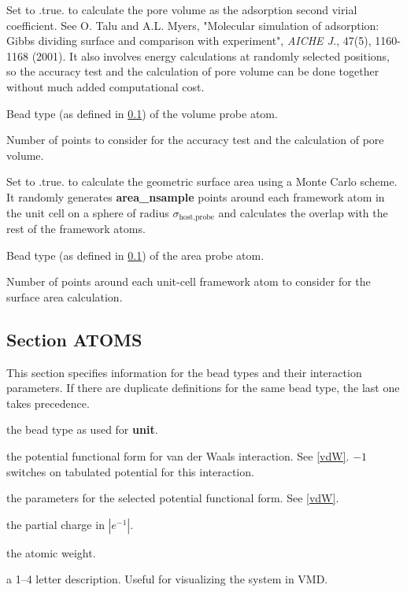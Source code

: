 \documentclass[12pt,letterpaper]{article}
\begin{document}
 Set to .true. to calculate the
pore volume as the adsorption second virial coefficient. See
O. Talu and A.L. Myers, "Molecular simulation of adsorption:
Gibbs dividing surface and comparison with experiment",
\textit{AICHE J.}, 47(5), 1160-1168 (2001). It also involves
energy calculations at randomly selected positions, so the
accuracy test and the calculation of pore volume can be done
together without much added computational cost.

 Bead type (as defined in
\ref{atoms}) of the volume probe atom.

 Number of points to consider
for the accuracy test and the calculation of pore volume.

 Set to .true. to calculate
the geometric surface area using a Monte Carlo scheme. It
randomly generates \textbf{area\_nsample} points around each
framework atom in the unit cell on a sphere of radius
$\sigma_{\textrm{host,probe}}$ and calculates the overlap
with the rest of the framework atoms.

 Bead type (as defined in
\ref{atoms}) of the area probe atom.

 Number of points around each
unit-cell framework atom to consider for the surface area
calculation.

\subsection{Section \textbf{ATOMS}}
\label{atoms}
This section specifies information for the bead types and
their interaction parameters. If there are duplicate
definitions for the same bead type, the last one takes
precedence.

 the bead type as used for {\bf unit}.

 the potential functional form for van
der Waals interaction. See \ref{vdW}. $-1$ switches on
tabulated potential for this interaction.

 the parameters for the
selected potential functional form. See \ref{vdW}.

 the partial charge in $|e^{-1}|$.

 the atomic weight.

 a 1--4 letter description. Useful for
visualizing the system in VMD.
\end{document}
